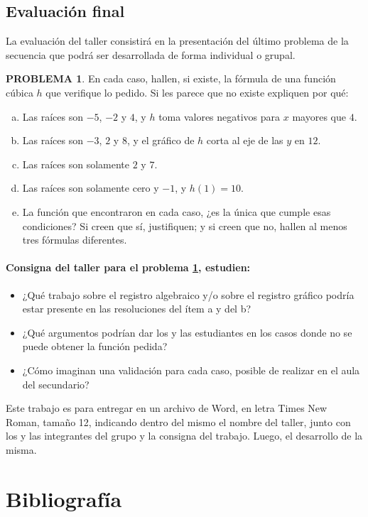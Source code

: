 \documentclass[oneside,spanish]{amsart}
\numberwithin{equation}{section}
\numberwithin{figure}{section}
\theoremstyle{definition}
\newtheorem{problema}{\normalfont PROBLEMA}
\begin{document}
\subsection{Evaluación final}

La evaluación del taller consistirá en la presentación del último problema de la secuencia que podrá ser desarrollada de forma individual o grupal.

\begin{problema}\label{prob:10}
En cada caso, hallen, si existe, la fórmula de una función cúbica $h$ que verifique lo pedido. Si les parece que no existe expliquen por qué:
\begin{enumerate}[a.]
	\item Las raíces son $-5$, $-2$ y $4$, y $h$ toma valores negativos para $x$ mayores que $4$.
	\item Las raíces son $-3$, $2$ y $8$, y el gráfico de $h$ corta al eje de las $y$ en $12$.
	\item Las raíces son solamente $2$ y $7$.
	\item Las raíces son solamente cero y $-1$, y $h(1) = 10$.
	\item La función que encontraron en cada caso, ¿es la única que cumple esas condiciones? Si creen que sí, justifiquen; y si creen que no, hallen al menos tres fórmulas diferentes.
\end{enumerate}
\end{problema}

\paragraph{Consigna del taller para el problema \ref{prob:10}, estudien:}
\begin{itemize}
	\item ¿Qué trabajo sobre el registro algebraico y/o sobre el registro gráfico podría estar presente en las resoluciones del ítem a y del b?
	\item ¿Qué argumentos podrían dar los y las estudiantes en los casos donde no se puede obtener la función pedida?
	\item ¿Cómo imaginan una validación para cada caso, posible de realizar en el aula del secundario?
\end{itemize}

Este trabajo es para entregar en un archivo de Word, en letra Times New Roman, tamaño 12, indicando dentro del mismo el nombre del taller, junto con los y las integrantes del grupo y la consigna del trabajo. Luego, el desarrollo de la misma.

\section{Bibliografía}

\nocite{introduccion-polinomios,conf-llanos-v,llanos-v}
\printbibliography
\end{document}
